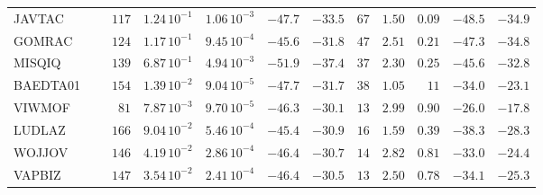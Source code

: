 \documentclass[main.tex]{subfiles}
\begin{document}
\begin{table}[hb]
\begin{tabular}{|lr|rrrrr|rrrrr|}
        JAVTAC &~\cite{JAVTAC}        &  $117$  &  $1.24\,10^{-1}$  &  $1.06\,10^{-3}$  &  $-47.7$  &  $-33.5$  &  $ 67$  &  $1.50$  &  $0.09$  &  $-48.5$  &  $-34.9$  \\
        GOMRAC &~\cite{GOMREG_GOMRAC} &  $124$  &  $1.17\,10^{-1}$  &  $9.45\,10^{-4}$  &  $-45.6$  &  $-31.8$  &  $ 47$  &  $2.51$  &  $0.21$  &  $-47.3$  &  $-34.8$  \\
        MISQIQ &~\cite{MISQIQ}        &  $139$  &  $6.87\,10^{-1}$  &  $4.94\,10^{-3}$  &  $-51.9$  &  $-37.4$  &  $ 37$  &  $2.30$  &  $0.25$  &  $-45.6$  &  $-32.8$  \\
      BAEDTA01 &~\cite{BAEDTA01}      &  $154$  &  $1.39\,10^{-2}$  &  $9.04\,10^{-5}$  &  $-47.7$  &  $-31.7$  &  $ 38$  &  $1.05$  &  $  11$  &  $-34.0$  &  $-23.1$  \\
        VIWMOF &~\cite{VIWMOF}        &  $ 81$  &  $7.87\,10^{-3}$  &  $9.70\,10^{-5}$  &  $-46.3$  &  $-30.1$  &  $ 13$  &  $2.99$  &  $0.90$  &  $-26.0$  &  $-17.8$  \\
        LUDLAZ &~\cite{LUDLAZ}        &  $166$  &  $9.04\,10^{-2}$  &  $5.46\,10^{-4}$  &  $-45.4$  &  $-30.9$  &  $ 16$  &  $1.59$  &  $0.39$  &  $-38.3$  &  $-28.3$  \\
        WOJJOV &~\cite{WOJJOV}        &  $146$  &  $4.19\,10^{-2}$  &  $2.86\,10^{-4}$  &  $-46.4$  &  $-30.7$  &  $ 14$  &  $2.82$  &  $0.81$  &  $-33.0$  &  $-24.4$  \\
        VAPBIZ &~\cite{VAPBIZ}        &  $147$  &  $3.54\,10^{-2}$  &  $2.41\,10^{-4}$  &  $-46.4$  &  $-30.5$  &  $ 13$  &  $2.50$  &  $0.78$  &  $-34.1$  &  $-25.3$  \\
    \hline
    \end{tabular}
\end{table}
\end{document}
